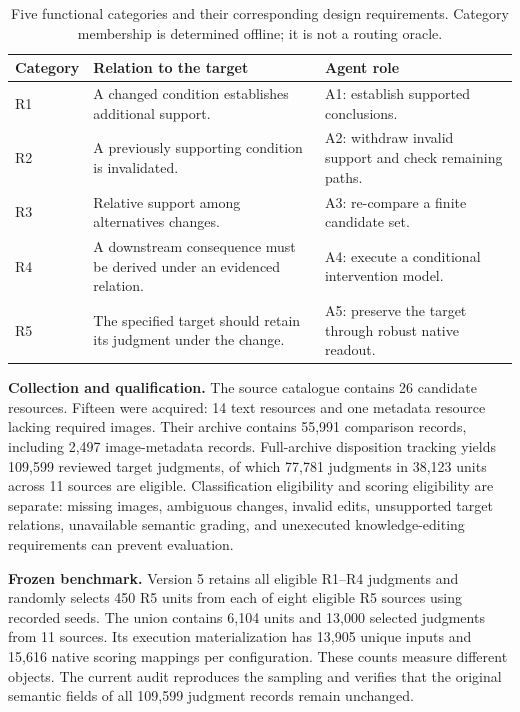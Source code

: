 \documentclass[11pt,a4paper]{article}
\begin{document}
\begin{table}[tbp]
\centering\small
\caption{Five functional categories and their corresponding design requirements. Category membership is determined offline; it is not a routing oracle.}
\label{tab:taxonomy}
\begin{tabularx}{\linewidth}{@{}lXX@{}}
\toprule
Category & Relation to the target & Agent role \\
\midrule
R1 & A changed condition establishes additional support. & A1: establish supported conclusions. \\
R2 & A previously supporting condition is invalidated. & A2: withdraw invalid support and check remaining paths. \\
R3 & Relative support among alternatives changes. & A3: re-compare a finite candidate set. \\
R4 & A downstream consequence must be derived under an evidenced relation. & A4: execute a conditional intervention model. \\
R5 & The specified target should retain its judgment under the change. & A5: preserve the target through robust native readout. \\
\bottomrule
\end{tabularx}
\end{table}

\textbf{Collection and qualification.} The source catalogue contains 26 candidate resources. Fifteen were acquired: 14 text resources and one metadata resource lacking required images. Their archive contains 55,991 comparison records, including 2,497 image-metadata records. Full-archive disposition tracking yields 109,599 reviewed target judgments, of which 77,781 judgments in 38,123 units across 11 sources are eligible. Classification eligibility and scoring eligibility are separate: missing images, ambiguous changes, invalid edits, unsupported target relations, unavailable semantic grading, and unexecuted knowledge-editing requirements can prevent evaluation.

\textbf{Frozen benchmark.} Version 5 retains all eligible R1--R4 judgments and randomly selects 450 R5 units from each of eight eligible R5 sources using recorded seeds. The union contains 6,104 units and 13,000 selected judgments from 11 sources. Its execution materialization has 13,905 unique inputs and 15,616 native scoring mappings per configuration. These counts measure different objects. The current audit reproduces the sampling and verifies that the original semantic fields of all 109,599 judgment records remain unchanged.
\end{document}
